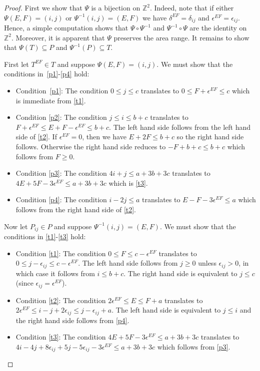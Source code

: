 \documentclass[11pt,reqno]{amsart}
\theoremstyle{definition}
\numberwithin{equation}{section}
\begin{document}
\begin{proof}
First we show that $\Psi$ is a bijection on $\mathbb{Z}^2$.  Indeed, note that if either $\Psi(E,F)=(i,j)$ or $\Psi^{-1}(i,j)=(E,F)$ 
we have $\delta^{EF}=\delta_{ij}$ and $\epsilon^{EF}=\epsilon_{ij}$.  Hence, a simple computation shows that  
$\Psi \circ \Psi^{-1}$ and  $\Psi^{-1} \circ \Psi$ are the identity on $\mathbb{Z}^2$.  Moreover, it is apparent that $\Psi$ 
preserves the area range. It remains to show that $\Psi(T) \subseteq P$ and $\Psi^{-1}(P)\subseteq T$.

First let $T^{EF} \in T$ and suppose $\Psi(E,F)=(i,j)$.  We must show that the conditions in~\eqref{p1}-\eqref{p4} hold:
 \begin{itemize}
 \item Condition~\eqref{p1}: The condition $0 \leqslant j \leqslant c$ translates to $0 \leqslant F+ \epsilon^{EF} \leqslant c$ 
 which is immediate from \eqref{t1}.
 \item Condition \eqref{p2}: The condition $j \leqslant i \leqslant b+c$ translates to $F+ \epsilon^{EF} \leqslant E+F -\epsilon^{EF}
  \leqslant b+c$. The left hand side follows from the left hand side of \eqref{t2}.  If $\epsilon^{EF}=0$, then we have 
  $E+2F \leqslant b+c$ so the right hand side follows.  
  Otherwise the right hand side reduces to $-F+b+c \leqslant b+c$ which follows from $F \geqslant 0$.
 \item Condition \eqref{p3}: The condition $4i+j \leqslant a+3b+3c$ translates to $4E+5F-3\epsilon^{EF} \leqslant a+3b+3c$
  which is \eqref{t3}.
 \item Condition \eqref{p4}: The condition $i-2j \leqslant a$ translates to $E-F-3\epsilon^{EF} \leqslant a$ which follows from 
 the right hand side of \eqref{t2}.
 \end{itemize}
 
Now let $P_{ij} \in P$ and suppose $\Psi^{-1}(i,j)=(E,F)$.  We must show that the conditions in \eqref{t1}-\eqref{t3} hold:
\begin{itemize}
\item Condition \eqref{t1}: The condition $0 \leqslant F \leqslant c-\epsilon^{EF}$ translates to 
$0 \leqslant j-\epsilon_{ij} \leqslant c-\epsilon^{EF}$. The left hand side follows from $j \geqslant 0$ unless $\epsilon_{ij}>0$, 
in which case it follows from $i \leqslant b+c$. The right hand side is equivalent to $j \leqslant c$ (since 
$\epsilon_{ij}=\epsilon^{EF}$).
\item Condition \eqref{t2}: The condition $2\epsilon^{EF} \leqslant E \leqslant F+a$ translates to 
$2\epsilon^{EF} \leqslant i-j+2\epsilon_{ij} \leqslant j-\epsilon_{ij}+a$.
The left hand side is equivalent to $j \leqslant i$ and the right hand side follows from \eqref{p4}.
\item Condition \eqref{t3}: The condition $4E+5F-3\epsilon^{EF} \leqslant a+3b+3c $ translates to 
$4i-4j+8\epsilon_{ij} +5j -5 \epsilon_{ij}-3\epsilon^{EF} \leqslant a+3b+3c $ which follows from \eqref{p3}.
\end{itemize}
\end{proof}
\end{document}

